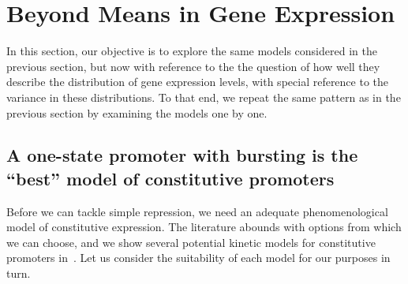 \section{Beyond Means in Gene Expression}
 
In this section, our objective is to explore the same models considered in
the previous section, but now with reference to the the question of
how well they describe the distribution of gene expression levels, with
special reference to the variance in these distributions.  To that end,
we repeat the same pattern as in the previous section by examining
the models one by one.

\subsection{A one-state promoter with bursting is the ``best'' model of constitutive promoters}
Before we can tackle simple repression, we need an adequate phenomenological
model of constitutive expression. The literature abounds with options from which
we can choose, and we show several potential kinetic models for constitutive
promoters in~. Let us consider the suitability of each
model for our purposes in turn.

